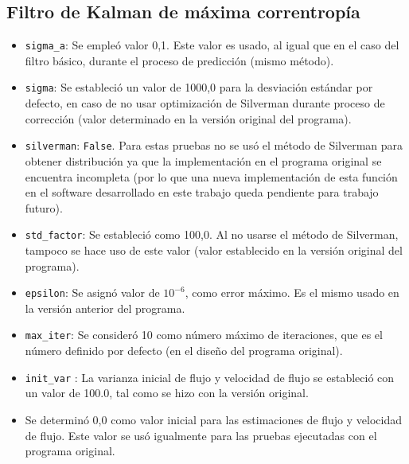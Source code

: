 \subsection*{Filtro de Kalman de m\'axima correntrop\'ia}
\begin{itemize}
\item \texttt{sigma\_a}: Se emple\'o valor 0,1. Este valor es usado, al igual que en el caso del filtro b\'asico, durante el proceso de predicci\'on (mismo m\'etodo).
\item \texttt{sigma}: Se estableci\'o un valor de 1000,0 para la desviaci\'on est\'andar por defecto, en caso de no usar optimizaci\'on de Silverman durante proceso de correcci\'on (valor determinado en la versi\'on original del programa).
\item \texttt{silverman}: \texttt{False}. Para estas pruebas no se us\'o el m\'etodo de Silverman para obtener distribuci\'on ya que la implementaci\'on en el programa original se encuentra incompleta (por lo que una nueva implementaci\'on de esta funci\'on en el software desarrollado en este trabajo queda pendiente para trabajo futuro). 
\item \texttt{std\_factor}: Se estableci\'o como 100,0. Al no usarse el m\'etodo de Silverman, tampoco se hace uso de este valor (valor establecido en la versi\'on original del programa).
\item \texttt{epsilon}: Se asign\'o valor de $10^{-6}$, como error m\'aximo. Es el mismo usado en la versi\'on anterior del programa.
\item \texttt{max\_iter}: Se consider\'o 10 como n\'umero m\'aximo de iteraciones, que es el n\'umero definido por defecto (en el dise\~no del programa original).  
\item \texttt{init\_var} : La varianza inicial de flujo y velocidad de flujo se estableci\'o con un valor de 100.0, tal como se hizo con la versi\'on original.
\item Se determin\'o 0,0 como valor inicial para las estimaciones de flujo y velocidad de flujo. Este valor se us\'o igualmente para las pruebas ejecutadas con el programa original.

\end{itemize}
